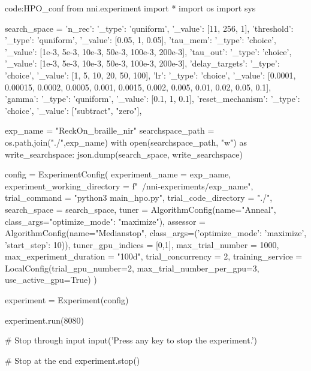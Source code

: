 \begin{mycodebox}{code:HPO_conf}
from nni.experiment import *
import os
import sys

search_space = {
    'n_rec': {'_type': 'quniform', '_value': [11, 256, 1]},
    'threshold': {'_type': 'quniform', '_value': [0.05, 1, 0.05]},
    'tau_mem': {'_type': 'choice', '_value': [1e-3, 5e-3, 10e-3, 50e-3, 100e-3, 200e-3]},
    'tau_out': {'_type': 'choice', '_value': [1e-3, 5e-3, 10e-3, 50e-3, 100e-3, 200e-3]},
    'delay_targets': {'_type': 'choice', '_value': [1, 5, 10, 20, 50, 100]},
    'lr': {'_type': 'choice', '_value': [0.0001, 0.00015, 0.0002, 0.0005, 0.001, 0.0015, 0.002, 0.005, 0.01, 0.02, 0.05, 0.1]},
    'gamma': {'_type': 'quniform', '_value': [0.1, 1, 0.1]},
    'reset_mechanism': {'_type': 'choice', '_value': ["subtract", "zero"]},
}

exp_name = "ReckOn_braille_nir"
searchspace_path = os.path.join("./",exp_name)
with open(searchspace_path, "w") as write_searchspace:
    json.dump(search_space, write_searchspace)

config = ExperimentConfig(
    experiment_name = exp_name,
    experiment_working_directory = f"~/nni-experiments/{exp_name}",
    trial_command = "python3 main_hpo.py",
    trial_code_directory = "./",
    search_space = search_space,
    tuner = AlgorithmConfig(name="Anneal",
                            class_args={"optimize_mode": "maximize"}),
    assessor = AlgorithmConfig(name="Medianstop",
                               class_args=({'optimize_mode': 'maximize',
                                            'start_step': 10})),
    tuner_gpu_indices = [0,1],
    max_trial_number = 1000,
    max_experiment_duration = "100d",
    trial_concurrency = 2,
    training_service = LocalConfig(trial_gpu_number=2,
                                   max_trial_number_per_gpu=3,
                                   use_active_gpu=True)
)

experiment = Experiment(config)

experiment.run(8080)

# Stop through input
input('Press any key to stop the experiment.')

# Stop at the end
experiment.stop()
\end{mycodebox}

